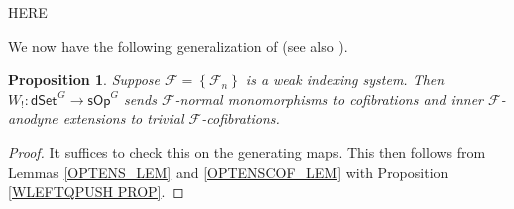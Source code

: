 \documentclass[a4paper,10pt
,draft
]{article}%
\numberwithin{equation}{section}
\numberwithin{figure}{section}
\newtheorem{proposition}[equation]{Proposition}%
\theoremstyle{definition} %
\newcommand{\set}[1]{\left\{#1\right\}}%
\newcommand{\vect}[1]{\text{\overrightharp{\ensuremath{#1}}}}
\newcommand{\sSet}{\ensuremath{\mathsf{sSet}}}%
\newcommand{\sOp}{\ensuremath{\mathsf{sOp}}}%
\newcommand{\dSet}{\mathsf{dSet}}
\DeclareMathOperator{\Aut}{Aut}%
\newcommand{\F}{\ensuremath{\mathcal F}}
\newcommand{\1}{\ensuremath{\mathbbm 1}}%
\begin{document}
{\color{red} HERE}

We now have the following generalization of \cite[Prop 4.5]{CM13b} (see also \cite[Prop. 6.15]{Per18}).


\begin{proposition}
      \label{W!_COF_PROP}
      Suppose $\F = \set{\F_n}$ is a weak indexing system.
      Then $W_!: \dSet^G \to \sOp^G$ sends $\F$-normal monomorphisms to cofibrations and inner $\F$-anodyne extensions to trivial $\F$-cofibrations.
\end{proposition}
\begin{proof}
      It suffices to check this on the generating maps.
      This then follows from
      Lemmas \ref{OPTENS_LEM} and \ref{OPTENSCOF_LEM} with Proposition \ref{WLEFTQPUSH PROP}.
\end{proof}
      
\end{document}

